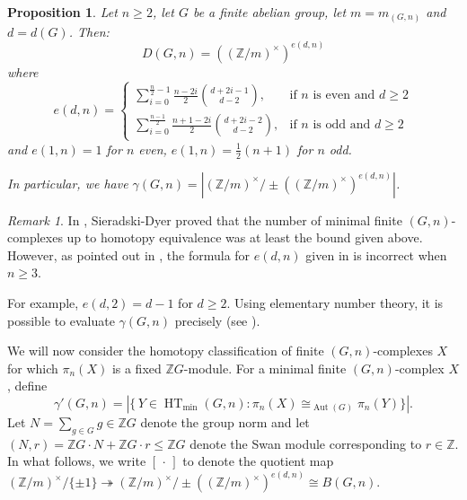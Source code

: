 \documentclass[11pt,a4paper,leqno]{amsart}
\newtheorem{proposition}[theorem]{Proposition}
\theoremstyle{definition}
\theoremstyle{remark}
\newtheorem{remark}[theorem]{Remark}
\newcommand{\Z}{\mathbb{Z}}
\DeclareMathOperator{\Aut}{Aut}
\DeclareMathOperator{\HT}{HT}
\begin{document}
\begin{proposition} \label{prop:compute-D(Gn)}
Let $n \ge 2$, let $G$ be a finite abelian group, let $m=m_{(G,n)}$ and $d = d(G)$.
Then:
\[ D(G,n) = ((\Z/m)^\times)^{e(d,n)}\] 
where 
\vspace{-2mm}
\[ 
e(d,n) = 
\begin{cases}
\sum_{i=0}^{\frac{n}{2}-1} \frac{n-2i}{2} \binom{d+2i-1}{d-2}, & \text{if $n$ is even and $d \ge 2$} \\
\sum_{i=0}^{\frac{n-1}{2}} \frac{n+1-2i}{2} \binom{d+2i-2}{d-2}, & \text{if $n$ is odd and $d \ge 2$}
\end{cases}
\]
and $e(1,n)=1$ for $n$ even, $e(1,n) = \frac{1}{2}(n+1)$ for $n$ odd.

In particular, we have $\gamma(G,n) = |(\Z/m)^\times / \pm ((\Z/m)^\times)^{e(d,n)}|$.
\end{proposition} 

\begin{remark} \label{remark:KS-error}
In \cite[Proposition 8]{Sieradski:1979}, Sieradski-Dyer proved that the number of minimal finite $(G,n)$-complexes up to homotopy equivalence was at least the bound given above. However, as pointed out in \cite[p305]{Linnell:1993}, the formula for $e(d,n)$ given in \cite[p210-211]{Sieradski:1979} is incorrect when $n \ge 3$. 
\end{remark}

For example, $e(d,2) = d-1$ for $d \ge 2$. Using elementary number theory, it is possible to evaluate $\gamma(G,n)$ precisely (see \cite[p137]{Sieradski:1977}).

We will now consider the homotopy classification of finite $(G,n)$-complexes $X$ for which $\pi_n(X)$ is a fixed $\Z G$-module. For a minimal finite $(G,n)$-complex $X$, define
\[ \gamma'(G,n) = |\{\, Y \in \HT_{\min}(G,n)\colon \pi_n(X) \cong_{\Aut(G)} \pi_n(Y) \}|.\] 
Let $N = \sum_{g \in G} g \in \Z G$ denote the group norm and let $(N,r) = \Z G \cdot N + \Z G \cdot r \le \Z G$ denote the Swan module corresponding to $r \in \Z$.
In what follows, we write $[\,\cdot\,]$ to denote the quotient map $(\Z/m)^\times/\{\pm 1\} \twoheadrightarrow (\Z/m)^\times/\pm ((\Z/m)^\times)^{e(d,n)} \cong B(G,n)$.
\end{document}
